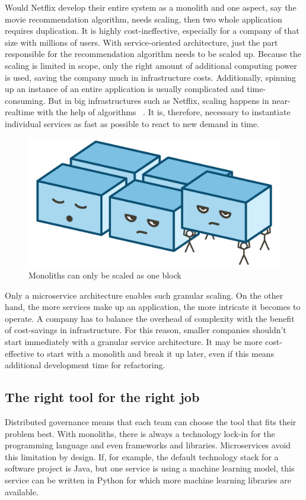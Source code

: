 Would Netflix develop their entire system as a monolith and one aspect, say the movie recommendation algorithm, needs scaling, then two whole application requires duplication. It is highly cost-ineffective, especially for a company of that size with millions of users. With service-oriented architecture, just the part responsible for the recommendation algorithm needs to be scaled up. Because the scaling is limited in scope, only the right amount of additional computing power is used, saving the company much in infrastructure costs. Additionally, spinning up an instance of an entire application is usually complicated and time-consuming. But in big infrastructures such as Netflix, scaling happens in near-realtime with the help of algorithms ~\cite{netflix.2013}. It is, therefore, necessary to instantiate individual services as fast as possible to react to new demand in time.

\begin{figure}[ht]
  \centering
  \includegraphics[width=0.55\linewidth]{assets/illustration-monolith-scaling.png}
  \caption{Monoliths can only be scaled as one block}
\end{figure}

Only a microservice architecture enables such granular scaling. On the other hand, the more services make up an application, the more intricate it becomes to operate. A company has to balance the overhead of complexity with the benefit of cost-savings in infrastructure. For this reason, smaller companies shouldn't start immediately with a granular service architecture. It may be more cost-effective to start with a monolith and break it up later, even if this means additional development time for refactoring.


\subsection{The right tool for the right job}

Distributed governance means that each team can choose the tool that fits their problem best. With monoliths, there is always a technology lock-in for the programming language and even frameworks and libraries. Microservices avoid this limitation by design. If, for example, the default technology stack for a software project is Java, but one service is using a machine learning model, this service can be written in Python for which more machine learning libraries are available.

